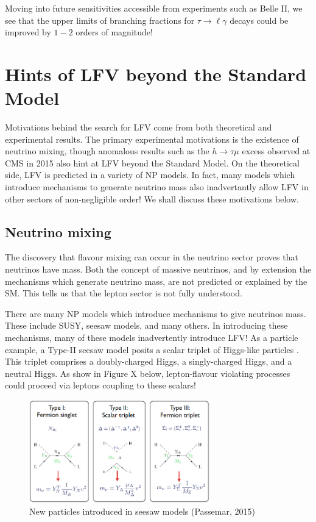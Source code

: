 \documentclass[12pt]{thesis}  %
\newcommand{\tlg}{\tau\to\ell\gamma}
\newcommand{\htm}{h\to \tau \mu}
\begin{document}
Moving into future sensitivities accessible from experiments such as Belle II, we see that the upper limits of branching fractions for $\tlg$ decays could be improved by $1-2$ orders of magnitude!

\section{Hints of LFV beyond the Standard Model}

Motivations behind the search for LFV come from both theoretical and experimental results. The primary experimental motivations is the existence of neutrino mixing, though anomalous results such as the $\htm$ excess observed at CMS in 2015 also hint at LFV beyond the Standard Model. On the theoretical side, LFV is predicted in a variety of NP models. In fact, many models which introduce mechanisms to generate neutrino mass also inadvertantly allow LFV in other sectors of non-negligible order! We shall discuss these motivations below.


\subsection{Neutrino mixing}

The discovery that flavour mixing can occur in the neutrino sector \cite{SuperK:1998}\cite{SNO:2002} proves that neutrinos have mass. Both the concept of massive neutrinos, and by extension the mechanisms which generate neutrino mass, are not predicted or explained by the SM. This tells us that the lepton sector is not fully understood.

There are many NP models which introduce mechanisms to give neutrinos mass. These include SUSY, seesaw models, and many others. In introducing these mechanisms, many of these models inadvertently introduce LFV! As a particle example, a Type-II seesaw model posits a scalar triplet of Higgs-like particles \cite{Passemar:2015}. This triplet comprises a doubly-charged Higgs, a singly-charged Higgs, and a neutral Higgs. As show in Figure X below, lepton-flavour violating processes could proceed via leptons coupling to these scalars!


\begin{figure}[h]
\centering
\includegraphics[width=0.7\textwidth]{images/seesaw.png}
\caption{New particles introduced in seesaw models (Passemar, 2015)}
\label{}
\end{figure}
\end{document}
